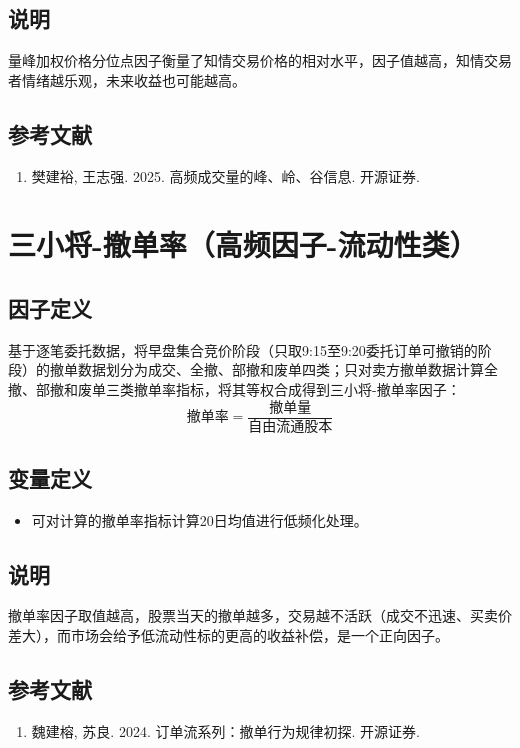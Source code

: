 \documentclass{article}
\begin{document}
\subsection{说明}
量峰加权价格分位点因子衡量了知情交易价格的相对水平，因子值越高，知情交易者情绪越乐观，未来收益也可能越高。

\subsection{参考文献}
\begin{enumerate}
    \item 樊建裕, 王志强. 2025. 高频成交量的峰、岭、谷信息. 开源证券.
\end{enumerate}

\section{三小将-撤单率（高频因子-流动性类）}

\subsection{因子定义}
基于逐笔委托数据，将早盘集合竞价阶段（只取9:15至9:20委托订单可撤销的阶段）的撤单数据划分为成交、全撤、部撤和废单四类；只对卖方撤单数据计算全撤、部撤和废单三类撤单率指标，将其等权合成得到三小将-撤单率因子：
\begin{equation}
    \text{撤单率} = \frac{\text{撤单量}}{\text{自由流通股本}}
\end{equation}

\subsection{变量定义}
\begin{itemize}
    \item 可对计算的撤单率指标计算20日均值进行低频化处理。
\end{itemize}

\subsection{说明}
撤单率因子取值越高，股票当天的撤单越多，交易越不活跃（成交不迅速、买卖价差大），而市场会给予低流动性标的更高的收益补偿，是一个正向因子。

\subsection{参考文献}
\begin{enumerate}
    \item 魏建榕, 苏良. 2024. 订单流系列：撤单行为规律初探. 开源证券.
\end{enumerate}
\end{document}
